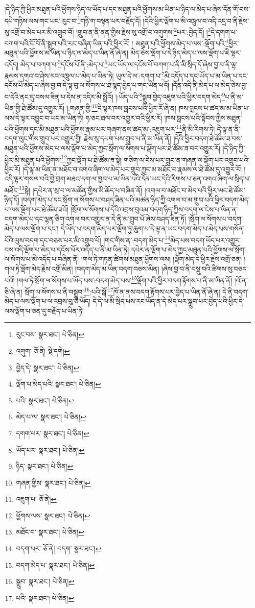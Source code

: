 །དེ་ཉིད་ཀྱི་ཕྱིར་མཐུན་པའི་ཕྱོགས་ཉིད་ལ་ཡོད་པ་དང་མཐུན་པའི་ཕྱོགས་མ་ཡིན་པ་ཉིད་ལ་མེད་པ་ཞེས་དོན་གོ་བས་དཔེ་གཉིས་ལས་གང་ཡང་:རུང་བ་\footnote{རུང་བས་  སྣར་ཐང་།  པེ་ཅིན། }གཉི་ག་བསྟན་པར་བརྗོད་དོ། །དེའི་ཕྱིར་ལྡོག་པ་མི་འཁྲུལ་བ་འདི་འདྲ་བ་ནི་རྗེས་སུ་འགྲོ་བ་མེད་པར་མི་འགྲུབ་བོ། །གྲུབ་ན་ནི་ནན་གྱིས་རྗེས་སུ་འགྲོ་བ་འགུགས་\footnote{འགུག་  ཅོ་ནེ།  སྡེ་དགེ། }པར་:བྱེད་དོ། །\footnote{བྱེད་དེ་  སྣར་ཐང་།  པེ་ཅིན། }དེ་དགག་པ་བཀག་པའི་ངོ་བོ་ནི་སྒྲུབ་པའི་རང་བཞིན་ཡིན་པའི་ཕྱིར་རོ། །
མཐུན་པའི་ཕྱོགས་མེད་པ་ལས་:ལྡོག་པའི་\footnote{ལྡོག་པ་མེད་པའི་  སྣར་ཐང་།  པེ་ཅིན། }ཕྱིར་མཐུན་པའི་ཕྱོགས་མ་ཡིན་པ་ཉིད་ལ་མེད་པ་ཡིན་ནོ་ཞེ་ན། མེད་ཅེས་ལྡོག་པ་དེ་ཉིད་མེད་པ་ལས་ལྡོག་པ་ཇི་ལྟར་འདོད། མེད་པ་བཀག་པ་\footnote{པའི་  སྣར་ཐང་།  པེ་ཅིན། }དངོས་པོ་ནི་:མེད་པ་\footnote{མེད་པ་ལ་  སྣར་ཐང་།  པེ་ཅིན། }ཡང་ཡོད་ལ་དངོས་པོ་བཀག་པ་ནི་མི་སྲིད་དོ་ཞེས་བྱ་བ་ནི་ལྷ་རྣམས་དགའ་བ་ཤེས་རབ་འཁྲུལ་པ་མེད་པ་ཡིན་ཏེ། ཡུལ་དེ་ལ་:དགག་པ་\footnote{དགག་པར་  སྣར་ཐང་།  པེ་ཅིན། }མི་འདོད་པ་དང་ཡོད་པ་མ་ཡིན་པ་དང་དངོས་པོ་མེད་པ་ཞེས་བྱ་བ་དེ་ལྟ་བུ་ལ་སོགས་པ་ཐ་སྙད་བྱེད་པ་གང་ཡིན་པའོ། །དོན་འདི་ནི་མེད་པ་ལ་མེད་ཅེས་བྱ་བ་དེའི་ནང་དུ་བསལ་ཟིན་པ་དེས་ན་འདིར་མི་སྤྲོའོ། །:ཡོད་པའི་\footnote{ཡོད་པར་  སྣར་ཐང་།  པེ་ཅིན། }སྒྲུབ་བྱེད་འཇུག་པའི་ཕྱིར་བདག་མེད་\footnote{ཉིད་  སྣར་ཐང་།  པེ་ཅིན། }པ་ནི་མ་ཡིན་གྱི་ཐེ་ཚོམ་དུ་འགྱུར་རོ། །:གཞན་གྱི་\footnote{གཞན་གྱིས་  སྣར་ཐང་།  པེ་ཅིན། }དེ་ལྟར་ཁས་བླངས་པའི་ཕྱིར་རོ་ཞེ་ན། ཁས་བླངས་པ་ཚད་མ་མ་ཡིན་པ་ལས་དེ་ལྟར་འབྱུང་བ་ཡང་མ་ཡིན་ཏེ། ཧ་ཅང་ཐལ་བར་འགྱུར་བའི་ཕྱིར་རོ། །ཁས་བླངས་པའི་སྟོབས་ཀྱིས་མཐུན་པའི་ཕྱོགས་དང་མི་མཐུན་པའི་ཕྱོགས་རྣམ་པར་གཞག་ནས་ཚད་མ་:འཇུག་པར་\footnote{འཇུག་པ་  ཅོ་ནེ། }ནི་མི་རིགས་ཏེ། དེ་ལྟ་ན་ནི་བདག་ལུང་གིས་གྲུབ་པར་འགྱུར་གྱི། རྗེས་སུ་དཔག་པས་གྲུབ་པ་ནི་མ་ཡིན་ནོ། །དེའི་ཕྱིར་བདག་ཐེ་ཚོམ་ཟ་བས་མཐུན་པའི་ཕྱོགས་མེད་པ་ལས་ལྡོག་པ་མེད་ཀྱང་སྲོག་ལ་སོགས་པ་ལྡོག་པར་ཐེ་ཚོམ་ཟ་བར་འགྱུར་རོ། །དེ་ཉིད་ཀྱི་ཕྱིར་མི་མཐུན་པའི་ཕྱོགས་\footnote{ཕྱོགས་ལས་  སྣར་ཐང་།  པེ་ཅིན། }ཀྱང་ལྡོག་པ་ཐེ་ཚོམ་ཟ་སྟེ། གཅིག་ལ་ངེས་པར་གྲུབ་ན་གཞན་ལ་ལྡོག་པར་འགྲུབ་པའི་ཕྱིར་རོ། །དེ་ལྟ་མ་ཡིན་ན་མཐོང་བ་འགའ་ཞིག་ལ་མེད་པར་གྲུབ་ཀྱང་མ་མཐོང་བ་རྣམས་ལ་ཐེ་ཚོམ་དུ་འགྱུར་རོ། །འདི་ལྟར་གསལ་བའི་བྱེ་བྲག་མཐའ་དག་ལ་ཁྱབ་པ་མ་ཡིན་པའི་དོན་ཡང་དེའི་རིགས་པ་ཅན་འགའ་ཞིག་ལ་སྲིད་པ་མཐོང་\footnote{མཐོང་བ་  སྣར་ཐང་།  པེ་ཅིན། }སྟེ། །དཔེར་ན་སྲ་བ་ལ་མཚོན་གྱིས་མི་ཆོད་པ་བཞིན་ནོ། །འགལ་བ་མཐོང་བ་མེད་པའི་ཕྱིར་ཡང་ཐེ་ཚོམ་ཉིད་དོ། །བདག་མེད་པ་དང་སྲོག་ལ་སོགས་པ་བཤད་ཟིན་པའི་མཚན་ཉིད་ཀྱི་འགལ་བ་མ་གྲུབ་པའི་ཕྱིར་བདག་མེད་པ་ལས་ལྡོག་པར་ཐེ་ཚོམ་ཟའོ། །སྲོག་ལ་སོགས་པ་དེའི་འབྲས་བུའམ་བདག་ཉིད་ཀྱིས་བདག་ལ་ངེས་པ་ཡིན་ན་བདག་མེད་པ་དང་ལྷན་ཅིག་འགལ་བར་འགྱུར་ན་དེ་ནི་མ་གྲུབ་པོ་ཞེས་བཤད་ཟིན་ཏོ། །སྲོག་ལ་སོགས་པ་བདག་མེད་པ་ལས་ལྡོག་པ་དང་། དེ་ཡོད་པ་བདག་མེད་པར་ལྡོག་ཏུ་ཆུག་པ་དེ་ལྟ་ན་ཡང་བདག་མེད་པ་མེད་པས་གསོན་པོའི་ལུས་བདག་དང་བཅས་པར་མི་འགྲུབ་པོ། །གང་གིས་ན་:བདག་མེད་པ་\footnote{བདག་པར་  ཅོ་ནེ། བདག་  སྣར་ཐང་། }མེད་པས་བདག་ཡོད་པར་འགྱུར་བས་འདི་ལྡོག་པ་མེད་པ་དངོས་པོར་འདོད་པ་ནི་མ་ཡིན་ཏེ། དཔེར་ན་ལྡོག་པ་མེད་ཀྱང་མཐུན་པའི་ཕྱོགས་ལ་སྲོག་ལ་སོགས་པ་མི་འདོད་པ་བཞིན་ནོ། །གལ་ཏེ་གཏན་ཚིགས་མཐུན་ཕྱོགས་ལས། །ལྡོག་མེད་དེ་ཕྱིར་རྗེས་འགྲོ་ཅན། །གལ་ཏེ་ལྡོག་མེད་རྗེས་འགྲོ་མིན། །བདག་མེད་མ་ཡིན་བདག་བཅས་མིན། །ཞེས་བྱ་བ་ནི་བསྡུ་བའི་ཚིགས་སུ་བཅད་པའོ། །གལ་ཏེ་སྲོག་ལ་སོགས་པ་ཡོད་པས་:བདག་མེད་པས་\footnote{བདག་མེད་པ་  སྣར་ཐང་།  པེ་ཅིན། }ལྡོག་པའི་ཕྱིར་བདག་རྟོགས་པ་ནི་མ་ཡིན་ནོ། །འོ་ན་ཅི་ཞེ་ན། སྲོག་ལ་སོགས་པ་ནི་བསྒྲུབ་\footnote{སྒྲུབ་  སྣར་ཐང་།  པེ་ཅིན། }:པའི་སྒོ་\footnote{པའི་  སྣར་ཐང་།  པེ་ཅིན། }ཁོ་ན་ནས་བདག་རྟོགས་པར་བྱེད་པ་ཡིན་ནོ་ཞེ་ན། དེ་ནི་བདག་མེད་པ་ལས་ལྡོག་པ་ལ་འབྲས་བུ་ཅི་ཡོད། དེ་དེ་ལ་མི་སྲིད་པས་རང་ཡོད་ན་དེ་མེད་པར་སྒྲུབ་པར་བྱེད་པའི་ཕྱིར་དེ་ལས་ལྡོག་པ་ཅན་དུ་བརྗོད་པ་ཡིན་ཏེ། 